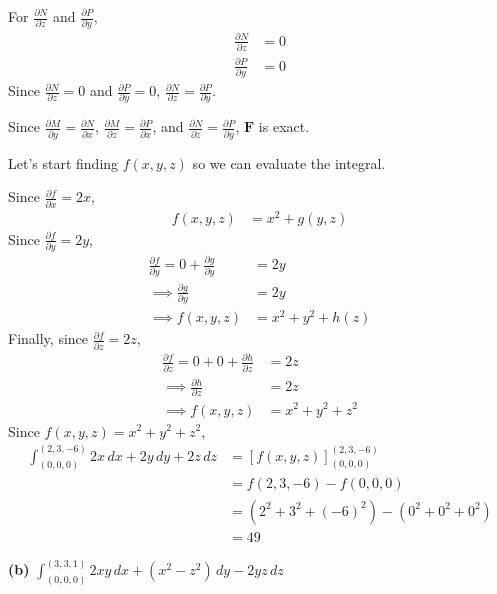 \documentclass{article}
\newcommand{\lrp}[1]{\left( #1 \right)}
\newcommand{\lrb}[1]{\left[ #1 \right]}
\newcommand{\F}[0]{\mathbf{F}}
\begin{document}
{}
For $\displaystyle \frac{\partial N}{\partial z}$ and $\displaystyle\frac{\partial P}{\partial y}$,
\begin{align*}
    \frac{\partial N}{\partial z}&=0\\
    \frac{\partial P}{\partial y}&=0
\end{align*}
Since $\displaystyle \frac{\partial N}{\partial z}=0$ and $\displaystyle\frac{\partial P}{\partial y}=0$, $\displaystyle \frac{\partial N}{\partial z}=\displaystyle\frac{\partial P}{\partial y}$.

Since $\displaystyle \frac{\partial M}{\partial y}=\frac{\partial N}{\partial x}$, $\displaystyle \frac{\partial M}{\partial z}=\frac{\partial P}{\partial x}$, and $\displaystyle \frac{\partial N}{\partial z}=\frac{\partial P}{\partial y}$, $\F$ is exact.

Let's start finding $f(x,y,z)$ so we can evaluate the integral.

Since $\displaystyle \frac{\partial f}{\partial x}=2x$,
\begin{align*}
    f(x,y,z)&=x^2+g(y,z)
\end{align*}
Since $\displaystyle \frac{\partial f}{\partial y}=2y$,
\begin{align*}
    \frac{\partial f}{\partial y}= 0 + \frac{\partial g}{\partial y}&= 2y\\
    \implies \frac{\partial g}{\partial y}&= 2y\\
    \implies f(x,y,z)&=x^2+y^2  +h(z)
\end{align*}
Finally, since $\displaystyle \frac{\partial f}{\partial z}=2z$,
\begin{align*}
\frac{\partial f}{\partial z}=0+0+\frac{\partial h}{\partial z}&=2z\\
\implies \frac{\partial h}{\partial z}&=2z\\
\implies f(x,y,z)&=x^2+y^2+z^2 \tag{let $C=0$ aka ignore $C$}
\end{align*}
Since $f(x,y,z)=x^2+y^2+z^2$,
\begin{align*}
    \int_{(0,0,0)}^{(2,3,-6)}2x\,dx+2y\,dy+2z\,dz&=\lrb{f(x,y,z)}_{(0,0,0)}^{(2,3,-6)}\\
    &=f(2,3,-6)-f(0,0,0)\\
    &=\lrp{2^2+3^2+(-6)^2}-\lrp{0^2+0^2+0^2}\\
    &=\boxed{49}
\end{align*}
\newpage
{}
{}\textbf{(b)} $\displaystyle \int_{(0,0,0)}^{(3,3,1)}2xy\,dx+(x^2-z^2)\,dy-2yz\,dz$
\end{document}
